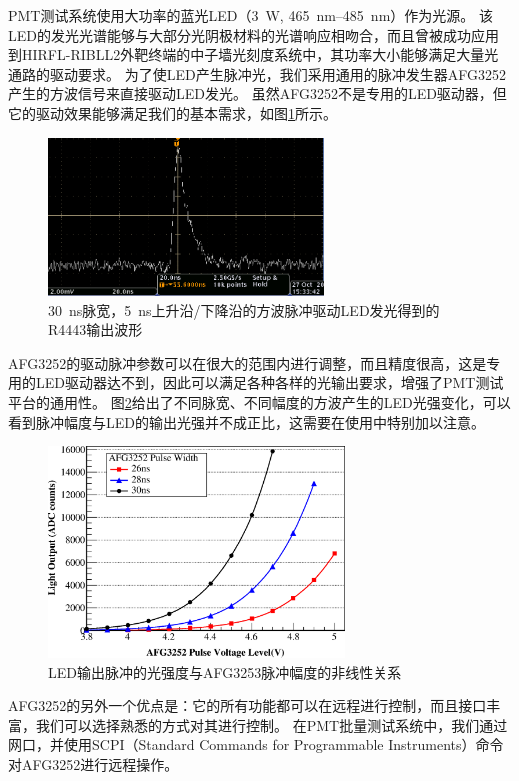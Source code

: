 PMT测试系统使用大功率的蓝光LED（\SI{3}{\watt}, \SIrange{465}{485}{\nano\meter}）作为光源。
该LED的发光光谱能够与大部分光阴极材料的光谱响应相吻合，而且曾被成功应用到HIRFL-RIBLL2外靶终端的中子墙光刻度系统中\cite{yuyuhong_led}，其功率大小能够满足大量光通路的驱动要求。
为了使LED产生脉冲光，我们采用通用的脉冲发生器AFG3252\cite{afg3252}产生的方波信号来直接驱动LED发光。
虽然AFG3252不是专用的LED驱动器，但它的驱动效果能够满足我们的基本需求，如图\ref{fig:pmt_test:led_pulse}所示。
\begin{figure}[htbp]
	\centering
	\includegraphics[width=0.65\textwidth]{chap/pmt_test/fig/led_pulse.jpg}
	\caption{\SI{30}{\nano\second}脉宽，\SI{5}{\nano\second}上升沿/下降沿的方波脉冲驱动LED发光得到的R4443输出波形}
	\label{fig:pmt_test:led_pulse}
\end{figure}
AFG3252的驱动脉冲参数可以在很大的范围内进行调整，而且精度很高，这是专用的LED驱动器达不到，因此可以满足各种各样的光输出要求，增强了PMT测试平台的通用性。
图\ref{fig:pmt_test:led_response}给出了不同脉宽、不同幅度的方波产生的LED光强变化，可以看到脉冲幅度与LED的输出光强并不成正比，这需要在使用中特别加以注意。
\begin{figure}[htbp]
	\centering
	\includegraphics[width=0.7\textwidth]{chap/pmt_test/fig/led_response.eps}
	\caption{LED输出脉冲的光强度与AFG3253脉冲幅度的非线性关系}
	\label{fig:pmt_test:led_response}
\end{figure}
AFG3252的另外一个优点是：它的所有功能都可以在远程进行控制，而且接口丰富，我们可以选择熟悉的方式对其进行控制。
在PMT批量测试系统中，我们通过网口，并使用SCPI（Standard Commands for Programmable Instruments）命令\cite{afg3000_programmer_manual}对AFG3252进行远程操作。

